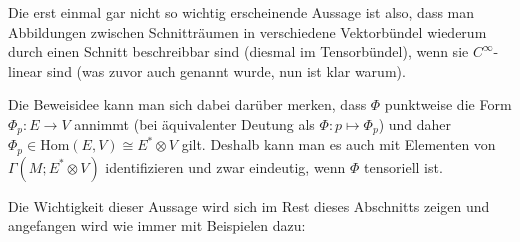 \documentclass[../H_Analysis_main.tex]{subfiles}
\begin{document}
Die erst einmal gar nicht so wichtig erscheinende Aussage ist also, dass man Abbildungen zwischen Schnitträumen in verschiedene Vektorbündel wiederum durch einen Schnitt beschreibbar sind (diesmal im Tensorbündel), wenn sie $C^\infty$-linear sind (was zuvor auch  genannt wurde, nun ist klar warum).

Die Beweisidee kann man sich dabei darüber merken, dass $\Phi$ punktweise die Form $\Phi_p: E \rightarrow V$ annimmt (bei äquivalenter Deutung als $\Phi: p \mapsto \Phi_p$) und daher $\Phi_p \in \text{Hom}(E, V) \cong E^* \otimes V$ gilt. Deshalb kann man es auch mit Elementen von $\Gamma(M; E^* \otimes V)$ identifizieren und zwar eindeutig, wenn $\Phi$ tensoriell ist.


Die Wichtigkeit dieser Aussage wird sich im Rest dieses Abschnitts zeigen und angefangen wird wie immer mit Beispielen dazu:
\end{document}
